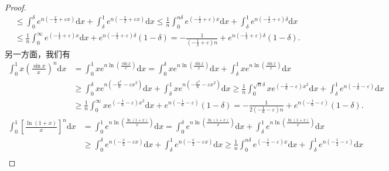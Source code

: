 \documentclass[../../main.tex]{subfiles}
\begin{document}
\begin{proof}
\begin{align*}
&\leqslant \int_0^{\delta}{e^{n\left( -\frac{x}{2}+\varepsilon x \right)}\mathrm{d}x}+\int_{\delta}^1{e^{n\left( -\frac{x}{2}+\varepsilon x \right)}\mathrm{d}x}\leqslant \frac{1}{n}\int_0^{n\delta}{e^{\left( -\frac{1}{2}+\varepsilon \right) x}\mathrm{d}x}+\int_{\delta}^1{e^{n\left( -\frac{1}{2}+\varepsilon \right) \delta}\mathrm{d}x}\\
&\leqslant \frac{1}{n}\int_0^{\infty}{e^{\left( -\frac{1}{2}+\varepsilon \right) x}\mathrm{d}x}+e^{n\left( -\frac{1}{2}+\varepsilon \right) \delta}\left( 1-\delta \right) =-\frac{1}{\left( -\frac{1}{2}+\varepsilon \right) n}+e^{n\left( -\frac{1}{2}+\varepsilon \right) \delta}\left( 1-\delta \right) .
\end{align*}
另一方面，我们有
\begin{align*}
\int_0^1{x\left( \frac{\sin x}{x} \right) ^n\mathrm{d}x}&=\int_0^1{xe^{n\ln \left( \frac{\sin x}{x} \right)}\mathrm{d}x}=\int_0^{\delta}{xe^{n\ln \left( \frac{\sin x}{x} \right)}\mathrm{d}x}+\int_{\delta}^1{xe^{n\ln \left( \frac{\sin x}{x} \right)}\mathrm{d}x}\\
&\geqslant \int_0^{\delta}{xe^{n\left( -\frac{x^2}{6}-\varepsilon x^2 \right)}\mathrm{d}x}+\int_{\delta}^1{xe^{n\left( -\frac{x^2}{6}-\varepsilon x^2 \right)}\mathrm{d}x}\geqslant \frac{1}{n}\int_0^{\sqrt{n}\delta}{xe^{\left( -\frac{1}{6}-\varepsilon \right) x^2}\mathrm{d}x}+\int_{\delta}^1{e^{n\left( -\frac{1}{6}-\varepsilon \right)}\mathrm{d}x}\\
&\geqslant \frac{1}{n}\int_0^{\infty}{xe^{\left( -\frac{1}{6}-\varepsilon \right) x^2}\mathrm{d}x}+e^{n\left( -\frac{1}{6}-\varepsilon \right)}\left( 1-\delta \right) =-\frac{1}{2\left( -\frac{1}{6}-\varepsilon \right) n}+e^{n\left( -\frac{1}{6}-\varepsilon \right)}\left( 1-\delta \right) .
\end{align*}
\begin{align*}
\int_0^1{\left[ \frac{\ln \left( 1+x \right)}{x} \right] ^n\mathrm{d}x}&=\int_0^1{e^{n\ln \left( \frac{\ln \left( 1+x \right)}{x} \right)}\mathrm{d}x}=\int_0^{\delta}{e^{n\ln \left( \frac{\ln \left( 1+x \right)}{x} \right)}\mathrm{d}x}+\int_{\delta}^1{e^{n\ln \left( \frac{\ln \left( 1+x \right)}{x} \right)}\mathrm{d}x}\\
&\geqslant \int_0^{\delta}{e^{n\left( -\frac{x}{2}-\varepsilon x \right)}\mathrm{d}x}+\int_{\delta}^1{e^{n\left( -\frac{x}{2}-\varepsilon x \right)}\mathrm{d}x}\geqslant \frac{1}{n}\int_0^{n\delta}{e^{\left( -\frac{1}{2}-\varepsilon \right) x}\mathrm{d}x}+\int_{\delta}^1{e^{n\left( -\frac{1}{2}-\varepsilon \right)}\mathrm{d}x}\\

\end{align*}
\end{proof}
\end{document}
